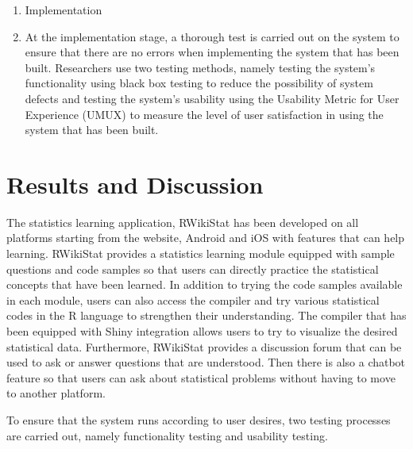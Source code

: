 \documentclass[conference,a4paper]{IEEEtran}
\begin{document}
\begin{enumerate}
  \item Implementation
  \item [] At the implementation stage, a thorough test is carried out on the system to ensure that there are no errors when implementing the system that has been built. Researchers use two testing methods, namely testing the system's functionality using black box testing to reduce the possibility of system defects and testing the system's usability using the Usability Metric for User Experience (UMUX) to measure the level of user satisfaction in using the system that has been built.


\end{enumerate}

\section{Results and Discussion}
\label{sect:results_discussion}

The statistics learning application, RWikiStat has been developed on all platforms starting from the website, Android and iOS with features that can help learning. RWikiStat provides a statistics learning module equipped with sample questions and code samples so that users can directly practice the statistical concepts that have been learned. In addition to trying the code samples available in each module, users can also access the compiler and try various statistical codes in the R language to strengthen their understanding. The compiler that has been equipped with Shiny integration allows users to try to visualize the desired statistical data. Furthermore, RWikiStat provides a discussion forum that can be used to ask or answer questions that are understood. Then there is also a chatbot feature so that users can ask about statistical problems without having to move to another platform.

To ensure that the system runs according to user desires, two testing processes are carried out, namely functionality testing and usability testing.
\end{document}

